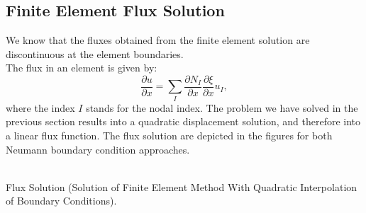 \documentclass[a4paper,12pt]{article}
\makeatletter
\newenvironment{figurehere}
  {\def\@captype{figure}}
  {}
\makeatother
\begin{document}
\subsection{Finite Element Flux Solution}
We know that the fluxes obtained from the finite element solution are discontinuous at the element boundaries.\\
The flux in an element is given by:
\begin{equation}
 \frac{\partial u}{\partial x} = \sum_{I}\frac{\partial N_I}{\partial x}\frac{\partial \xi}{\partial x}u_I,
\end{equation}
where the index $I$ stands for the nodal index.
The problem we have solved in the previous section results into a quadratic displacement solution, and therefore into a linear flux function. The flux solution are depicted in the figures for both Neumann boundary condition approaches.
\begin{center}
\begin{figurehere} 
\\
\caption{Flux Solution (Solution of Finite Element Method With Quadratic Interpolation of Boundary Conditions).}\label{fig:fluxquad}
\end{figurehere} 
\end{center}
\end{document}
